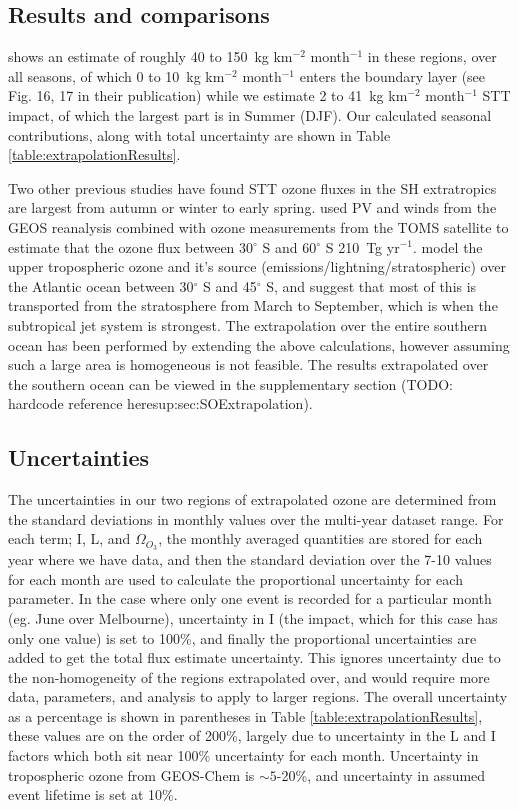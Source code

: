 \documentclass[acp, manuscript]{copernicus} %
\begin{document}
  \subsection{Results and comparisons}
    \cite{Skerlak2014} shows an estimate of roughly 40 to 150~kg km$^{-2}$ month$^{-1}$ in these regions, over all seasons, of which 0 to 10~kg km$^{-2}$ month$^{-1}$ enters the boundary layer (see Fig. 16, 17 in their publication) while we estimate 2 to 41~kg km$^{-2}$ month$^{-1}$ STT impact, of which the largest part is in Summer (DJF).
    Our calculated seasonal contributions, along with total uncertainty are shown in Table \ref{table:extrapolationResults}.
    
    Two other previous studies have found STT ozone fluxes in the SH extratropics are largest from autumn or winter to early spring.
    \citet{Olsen2003} used PV and winds from the GEOS reanalysis combined with ozone measurements from the TOMS satellite to estimate that the ozone flux between 30$^{\circ}$ S and 60$^{\circ}$ S 210~Tg yr$^{-1}$.
    \citet{Liu2016} model the upper tropospheric ozone and it's source (emissions/lightning/stratospheric) over the Atlantic ocean between 30$^{\circ}$ S and 45$^{\circ}$ S, and suggest that most of this is transported from the stratosphere from March to September, which is when the subtropical jet system is strongest.
    The extrapolation over the entire southern ocean has been performed by extending the above calculations, however assuming such a large area is homogeneous is not feasible.
    The results extrapolated over the southern ocean can be viewed in the supplementary section (TODO: hardcode reference here{sup:sec:SOExtrapolation}).
  
  \subsection{Uncertainties}
    The uncertainties in our two regions of extrapolated ozone are determined from the standard deviations in monthly values over the multi-year dataset range.
    For each term; I, L, and $\Omega_{O_3}$, the monthly averaged quantities are stored for each year where we have data, and then the standard deviation over the 7-10 values for each month are used to calculate the proportional uncertainty for each parameter.
    In the case where only one event is recorded for a particular month (eg. June over Melbourne), uncertainty in I (the impact, which for this case has only one value) is set to 100\%, and finally the proportional uncertainties are added to get the total flux estimate uncertainty.
    This ignores uncertainty due to the non-homogeneity of the regions extrapolated over, and would require more data, parameters, and analysis to apply to larger regions.
    The overall uncertainty as a percentage is shown in parentheses in Table \ref{table:extrapolationResults}, these values are on the order of 200\%, largely due to uncertainty in the L and I factors which both sit near 100\% uncertainty for each month.
    Uncertainty in tropospheric ozone from GEOS-Chem is $\sim 5$-20\%, and uncertainty in assumed event lifetime is set at 10\%.
    
\end{document}
